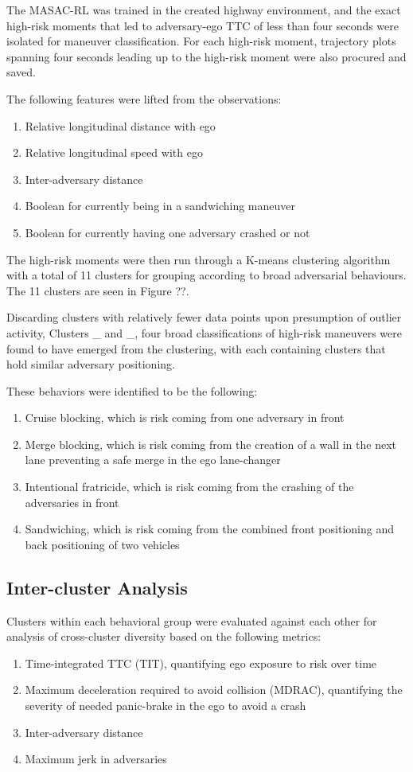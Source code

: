 \documentclass[12pt, a4paper]{report}
\begin{document}
The MASAC-RL was trained in the created highway environment, and the exact high-risk moments that led to adversary-ego TTC of less than four seconds were isolated for maneuver classification. For each high-risk moment, trajectory plots spanning four seconds leading up to the high-risk moment were also procured and saved.

The following features were lifted from the observations:

\begin{enumerate}
    \item Relative longitudinal distance with ego
    \item Relative longitudinal speed with ego
    \item Inter-adversary distance
    \item Boolean for currently being in a sandwiching maneuver
    \item Boolean for currently having one adversary crashed or not
\end{enumerate}

The high-risk moments were then run through a K-means clustering algorithm with a total of 11 clusters for grouping according to broad adversarial behaviours. The 11 clusters are seen in Figure ??.

Discarding clusters with relatively fewer data points upon presumption of outlier activity, Clusters _ and _, four broad classifications of high-risk maneuvers were found to have emerged from the clustering, with each containing clusters that hold similar adversary positioning.

These behaviors were identified to be the following:
\begin{enumerate}
    \item Cruise blocking, which is risk coming from one adversary in front
    \item Merge blocking, which is risk coming from the creation of a wall in the next lane preventing a safe merge in the ego lane-changer
    \item Intentional fratricide, which is risk coming from the crashing of the adversaries in front
    \item Sandwiching, which is risk coming from the combined front positioning and back positioning of two vehicles
\end{enumerate}

\subsection{Inter-cluster Analysis}
Clusters within each behavioral group were evaluated against each other for analysis of cross-cluster diversity based on the following metrics:
\begin{enumerate}
    \item Time-integrated TTC (TIT), quantifying ego exposure to risk over time
    \item Maximum deceleration required to avoid collision (MDRAC), quantifying the severity of needed panic-brake in the ego to avoid a crash
    \item Inter-adversary distance
    \item Maximum jerk in adversaries
\end{enumerate}
\end{document}

